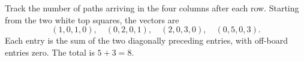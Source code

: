 Track the number of paths arriving in the four columns after each row. Starting from the two white top squares, the vectors are
\[
(1,0,1,0),\quad(0,2,0,1),\quad(2,0,3,0),\quad(0,5,0,3).
\]
Each entry is the sum of the two diagonally preceding entries, with off-board entries zero. The total is $\boxed{5+3=8}$.
